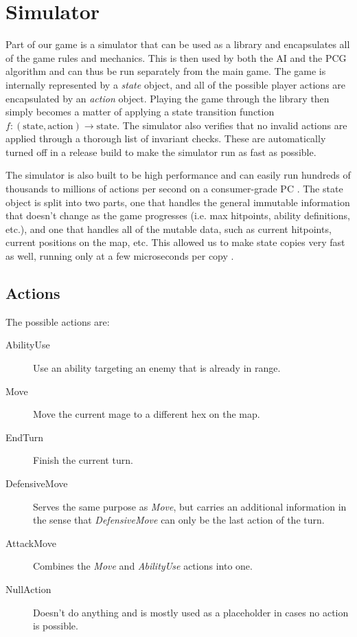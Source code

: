 \section{Simulator}

Part of our game is a simulator that can be used as a library and encapsulates all of the
game rules and mechanics. This is then used by both the AI and the PCG algorithm and can thus
be run separately from the main game. The game is internally represented by a \emph{state} object,
and all of the possible player actions are encapsulated by an \emph{action} object.
Playing the game through the library then simply becomes a matter of applying a state transition
function $f: (\text{state}, \text{action}) \rightarrow \text{state}$. The simulator also verifies that no invalid actions are applied through a thorough list of invariant
checks. These are automatically turned off in a release build to make the simulator run as fast as possible.

The simulator is also built to be high performance and can easily run hundreds of thousands to millions
of actions per second on a consumer-grade PC . The state object is split into two parts,
one that handles the general immutable information that doesn't change as the game progresses (i.e. max hitpoints, ability definitions, etc.),
and one that handles all of the mutable data, such as current hitpoints, current positions on the map, etc.
This allowed us to make state copies very fast as well, running only at a few microseconds per copy .

\subsection{Actions}
The possible actions are:

\begin{description}
\item [AbilityUse] Use an ability targeting an enemy that is already in range.
\item [Move] Move the current mage to a different hex on the map.
\item [EndTurn] Finish the current turn.
\item [DefensiveMove] Serves the same purpose as \emph{Move}, but carries an
additional information in the sense that \emph{DefensiveMove} can only be
the last action of the turn.
\item [AttackMove] Combines the \emph{Move} and \emph{AbilityUse} actions into one.
\item [NullAction] Doesn't do anything and is mostly used as a placeholder in cases no action is possible.
\end{description}
